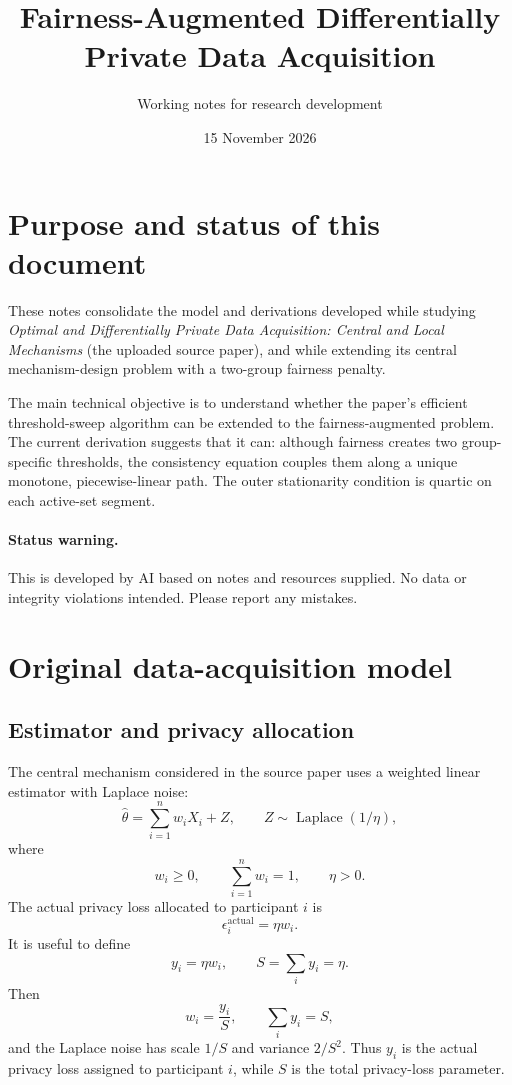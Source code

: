 \documentclass[11pt,a4paper]{article}
\title{\textbf{Fairness-Augmented Differentially Private Data Acquisition}\\
}
\author{Working notes for research development}
\date{15 November 2026}
\newcommand{\1}{\mathbf{1}}
\newcommand{\Lap}{\operatorname{Laplace}}
\begin{document}
\maketitle
\tableofcontents
\newpage

\section{Purpose and status of this document}

These notes consolidate the model and derivations developed while studying
\emph{Optimal and Differentially Private Data Acquisition: Central and Local
Mechanisms} (the uploaded source paper), and while extending its central
mechanism-design problem with a two-group fairness penalty.

The main technical objective is to understand whether the paper's efficient
threshold-sweep algorithm can be extended to the fairness-augmented problem.
The current derivation suggests that it can: although fairness creates two
group-specific thresholds, the consistency equation couples them along a
unique monotone, piecewise-linear path. The outer stationarity condition is
quartic on each active-set segment.

\paragraph{Status warning.}
This is developed by AI based on notes and resources supplied. No data or integrity violations intended. Please report any mistakes.

\section{Original data-acquisition model}

\subsection{Estimator and privacy allocation}

The central mechanism considered in the source paper uses a weighted linear
estimator with Laplace noise:
\begin{equation}
  \widehat{\theta}
  = \sum_{i=1}^n w_i X_i + Z,
  \qquad
  Z\sim \Lap(1/\eta),
  \label{eq:estimator}
\end{equation}
where
\begin{equation}
  w_i\geq 0,\qquad \sum_{i=1}^n w_i=1,\qquad \eta>0.
\end{equation}
The actual privacy loss allocated to participant \(i\) is
\begin{equation}
  \epsilon_i^{\mathrm{actual}}=\eta w_i.
\end{equation}
It is useful to define
\begin{equation}
  y_i=\eta w_i,\qquad S=\sum_i y_i=\eta.
  \label{eq:yS}
\end{equation}
Then
\begin{equation}
  w_i=\frac{y_i}{S},\qquad \sum_i y_i=S,
\end{equation}
and the Laplace noise has scale \(1/S\) and variance \(2/S^2\).
Thus \(y_i\) is the actual privacy loss assigned to participant \(i\), while
\(S\) is the total privacy-loss parameter.
\end{document}
